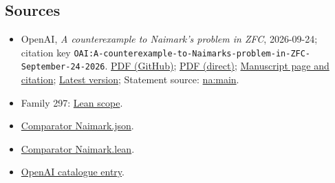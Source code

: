 \documentclass[11pt]{article}
\begin{document}
\subsection{Sources}
\begin{itemize}
\item OpenAI, \emph{A counterexample to Naimark's problem in ZFC}, 2026-09-24; citation key \texttt{OAI:A-counterexample-to-Naimarks-problem-in-ZFC-September-24-2026}. \href{https://github.com/openai/math/blob/adc7f1241b42e322a6451854ab7e4b4c146bf78a/preprints/A-counterexample-to-Naimarks-problem-in-ZFC-September-24-2026/naimark-counterexample-zfc.pdf}{PDF (GitHub)}; \href{https://github.com/openai/math/raw/adc7f1241b42e322a6451854ab7e4b4c146bf78a/preprints/A-counterexample-to-Naimarks-problem-in-ZFC-September-24-2026/naimark-counterexample-zfc.pdf}{PDF (direct)}; \href{https://github.com/openai/math/blob/adc7f1241b42e322a6451854ab7e4b4c146bf78a/preprints/A-counterexample-to-Naimarks-problem-in-ZFC-September-24-2026/README.md}{Manuscript page and citation}; \href{https://github.com/openai/math/blob/main/preprints/A-counterexample-to-Naimarks-problem-in-ZFC-September-24-2026/naimark-counterexample-zfc.pdf}{Latest version}; Statement source: \href{https://github.com/openai/math/blob/adc7f1241b42e322a6451854ab7e4b4c146bf78a/preprints/A-counterexample-to-Naimarks-problem-in-ZFC-September-24-2026/build/sections/introduction.tex\#L10}{na:main}.
\item Family 297: \href{https://github.com/openai/math/blob/adc7f1241b42e322a6451854ab7e4b4c146bf78a/lean/docs/297.md}{Lean scope}.
\item \href{https://github.com/openai/math/blob/adc7f1241b42e322a6451854ab7e4b4c146bf78a/lean/ComparatorChallenges/Naimark.json}{Comparator Naimark.json}.
\item \href{https://github.com/openai/math/blob/adc7f1241b42e322a6451854ab7e4b4c146bf78a/lean/ComparatorChallenges/Naimark.lean}{Comparator Naimark.lean}.
\item \href{https://github.com/openai/math/blob/adc7f1241b42e322a6451854ab7e4b4c146bf78a/CONTENTS.md}{OpenAI catalogue entry}.
\end{itemize}
\end{document}
